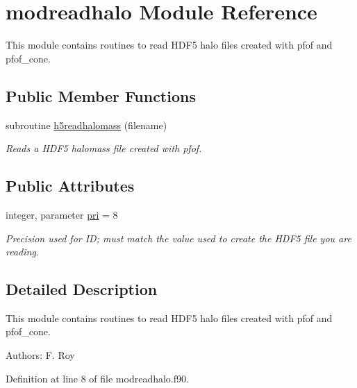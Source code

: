 \hypertarget{classmodreadhalo}{\section{modreadhalo Module Reference}
\label{classmodreadhalo}
}


This module contains routines to read H\-D\-F5 halo files created with pfof and pfof\-\_\-cone.  


\subsection*{Public Member Functions}
\begin{DoxyCompactItemize}
\item 
subroutine \hyperlink{classmodreadhalo_a5e581ff805da170ad66cbd51e3b4967e}{h5readhalomass} (filename)
\begin{DoxyCompactList}\small\item\em Reads a H\-D\-F5 halomass file created with pfof. \end{DoxyCompactList}\end{DoxyCompactItemize}
\subsection*{Public Attributes}
\begin{DoxyCompactItemize}
\item 
integer, parameter \hyperlink{classmodreadhalo_ad55bcc6ce90e0b688319fd72bf579b36}{pri} = 8
\begin{DoxyCompactList}\small\item\em Precision used for I\-D; must match the value used to create the H\-D\-F5 file you are reading. \end{DoxyCompactList}\end{DoxyCompactItemize}


\subsection{Detailed Description}
This module contains routines to read H\-D\-F5 halo files created with pfof and pfof\-\_\-cone. 

Authors\-: F. Roy 

Definition at line 8 of file modreadhalo.\-f90.



